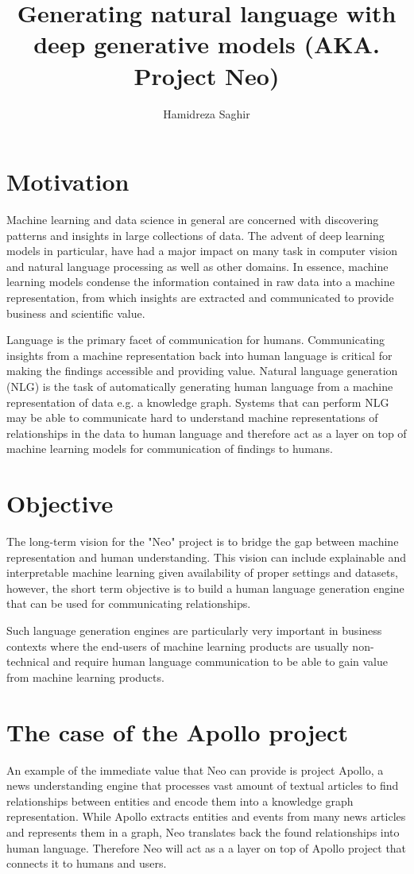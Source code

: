 \documentclass[a4paper]{article}
\title{Generating natural language with deep generative models (AKA. Project Neo)}
\author{Hamidreza Saghir}
\begin{document}
\maketitle


\section{Motivation}

Machine learning and data science in general are concerned with discovering patterns and insights in large collections of data. The advent of deep learning models in particular, have had a major impact on many task in computer vision and natural language processing as well as other domains. In essence, machine learning models condense the information contained in raw data into a machine representation, from which insights are extracted and communicated to provide business and scientific value.

Language is the primary facet of communication for humans. Communicating insights from a machine representation back into human language is critical for making the findings accessible and providing value. Natural language generation (NLG) is the task of automatically generating human language from a machine representation of data e.g. a knowledge graph. Systems that can perform NLG may be able to communicate hard to understand machine representations of relationships in the data to human language and therefore act as a layer on top of machine learning models for communication of findings to humans.

\section{Objective}
The long-term vision for the "Neo" project is to bridge the gap between machine representation and human understanding. This vision can include explainable and interpretable machine learning given availability of proper settings and datasets, however, the short term objective is to build a human language generation engine that can be used for communicating relationships. 

Such language generation engines are particularly very important in business contexts where the end-users of machine learning products are usually non-technical and require human language communication to be able to gain value from machine learning products. 

\section{The case of the Apollo project}
An example of the immediate value that Neo can provide is project Apollo, a news understanding engine that processes vast amount of textual articles to find relationships between entities and encode them into a knowledge graph representation. While Apollo extracts entities and events from many news articles and represents them in a graph, Neo translates back the found relationships into human language. Therefore Neo will act as a a layer on top of Apollo project that connects it to humans and users.
\end{document}

